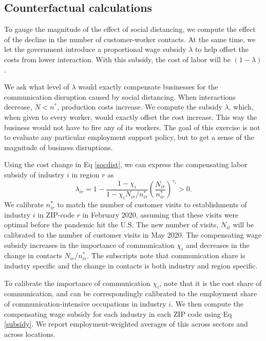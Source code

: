 \documentclass[10pt,letterpaper]{article}
\begin{document}
\subsection*{Counterfactual calculations}
To gauge the magnitude of the effect of social distancing, we compute the effect of the decline in the number of customer-worker contacts. At the same time, we let the government introduce a proportional wage subsidy $\lambda$ to help offset the costs from lower interaction. With this subsidy, the cost of labor will be $(1-\lambda)$. 

We ask what level of $\lambda$ would exactly compensate businesses for the communication disruption caused by social distancing. When interactions decrease, $N<n^*$, production costs increase. We compute the subsidy $\lambda$, which, when given to every worker, would exactly offset the cost increase. This way the business would not have to fire any of its workers. The goal of this exercise is not to evaluate any particular employment support policy, but to get a sense of the magnitude of business disruptions. 

Using the cost change in Eq \ref{socdist}, we can express the compensating labor subsidy of industry $i$ in region $r$ as
\begin{equation}\label{subsidy}
    \lambda_{ir} = 1 -
        \frac{1-\chi_i}{1-\chi_i N_{ir}/n_{ir}^*}
        \left(
        \frac{N_{ir}}{n_{ir}^*}
        \right)^{\gamma_i}>0.
\end{equation}
We calibrate $n_{ir}^*$ to match the number of customer visits to establishments of industry $i$ in ZIP-code $r$ in February 2020, assuming that these visits were optimal before the pandemic hit the U.S. The new number of visits, $N_{it}$ will be calibrated to the number of customer visits in May 2020. The compensating wage subsidy increases in the importance of communication $\chi_i$ and decreases in the change in contacts $N_{ir}/n^*_{ir}$. The subscripts note that communication share is industry specific and the change in contacts is both industry and region specific.

To calibrate the importance of communication $\chi_i$, note that it is the cost share of communication, and can be correspondingly calibrated to the employment share of communication-intensive occupations in industry $i$. We then compute the compensating wage subsidy for each industry in each ZIP code using Eq \ref{subsidy}. We report employment-weighted averages of this across sectors and across locations.
\end{document}
